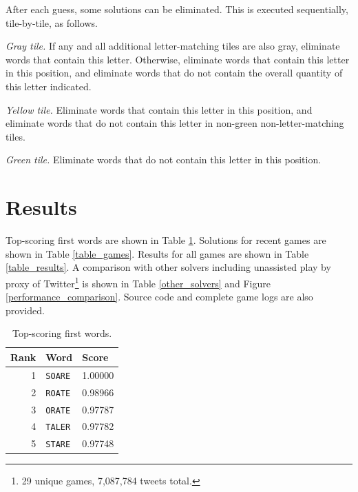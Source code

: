 \documentclass[twocolumn]{tudelft-aiaa}
\begin{document}
After each guess, some solutions can be eliminated. This is executed sequentially, tile-by-tile, as follows.

\emph{Gray tile.} If any and all additional letter-matching tiles are also gray, eliminate words that contain this letter. Otherwise, eliminate words that contain this letter in this position, and eliminate words that do not contain the overall quantity of this letter indicated.

\emph{Yellow tile.} Eliminate words that contain this letter in this position, and eliminate words that do not contain this letter in non-green non-letter-matching tiles.

\emph{Green tile.} Eliminate words that do not contain this letter in this position.

\section{Results}

Top-scoring first words are shown in Table \ref{table_words}. Solutions for recent games are shown in Table \ref{table_games}. Results for all games are shown in Table \ref{table_results}. A comparison with other solvers including unassisted play by proxy of Twitter\footnote{29 unique games, 7,087,784 tweets total.} is shown in Table \ref{other_solvers} and Figure \ref{performance_comparison}.\cite{WordleStats} Source code and complete game logs are also provided.\cite{Dichter}

\begin{table}[h!]
\begin{centering}
\begin{tabular}{ r | l | l}
\bf Rank & \bf Word & \bf Score\\
\hline
1  & \texttt{SOARE} & 1.00000\\
2  & \texttt{ROATE} & 0.98966\\
3  & \texttt{ORATE} & 0.97787\\
4  & \texttt{TALER} & 0.97782\\
5  & \texttt{STARE} & 0.97748\\
\end{tabular}
\vspace{2 mm}
\caption{Top-scoring first words.}
\label{table_words}
\end{centering}
\end{table}
\end{document}
